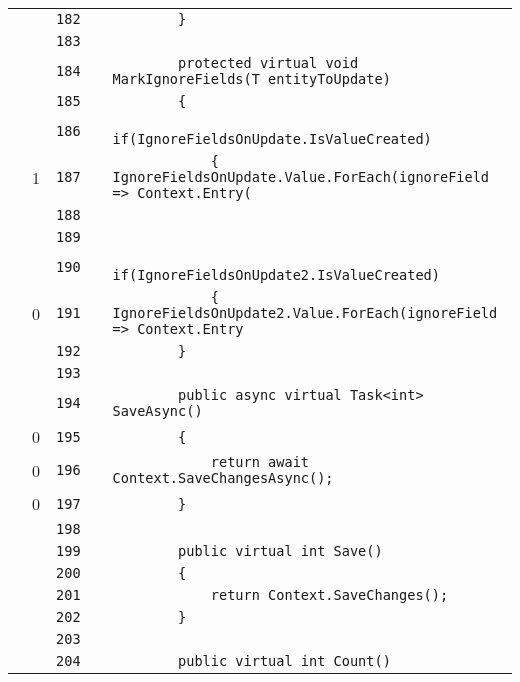 \documentclass[a4paper,10pt]{article}
\begin{document}
\begin{longtable}[l]{lrrll}
\cellcolor{gray} &  & \verb~182~ & & \verb~        }~\\
\cellcolor{gray} &  & \verb~183~ & & \verb~~\\
\cellcolor{gray} &  & \verb~184~ & & \verb~        protected virtual void MarkIgnoreFields(T entityToUpdate)~\\
\cellcolor{gray} &  & \verb~185~ & & \verb~        {~\\
\cellcolor{gray} &  & \verb~186~ & & \verb~            if(IgnoreFieldsOnUpdate.IsValueCreated)~\\
\cellcolor{green} & 1 & \verb~187~ & & \verb~            { IgnoreFieldsOnUpdate.Value.ForEach(ignoreField => Context.Entry(~\\
\cellcolor{gray} &  & \verb~188~ & & \verb~~\\
\cellcolor{gray} &  & \verb~189~ & & \verb~~\\
\cellcolor{gray} &  & \verb~190~ & & \verb~            if(IgnoreFieldsOnUpdate2.IsValueCreated)~\\
\cellcolor{red} & 0 & \verb~191~ & & \verb~            { IgnoreFieldsOnUpdate2.Value.ForEach(ignoreField => Context.Entry~\\
\cellcolor{gray} &  & \verb~192~ & & \verb~        }~\\
\cellcolor{gray} &  & \verb~193~ & & \verb~~\\
\cellcolor{gray} &  & \verb~194~ & & \verb~        public async virtual Task<int> SaveAsync()~\\
\cellcolor{red} & 0 & \verb~195~ & & \verb~        {~\\
\cellcolor{red} & 0 & \verb~196~ & & \verb~            return await Context.SaveChangesAsync();~\\
\cellcolor{red} & 0 & \verb~197~ & & \verb~        }~\\
\cellcolor{gray} &  & \verb~198~ & & \verb~~\\
\cellcolor{gray} &  & \verb~199~ & & \verb~        public virtual int Save()~\\
\cellcolor{gray} &  & \verb~200~ & & \verb~        {~\\
\cellcolor{gray} &  & \verb~201~ & & \verb~            return Context.SaveChanges();~\\
\cellcolor{gray} &  & \verb~202~ & & \verb~        }~\\
\cellcolor{gray} &  & \verb~203~ & & \verb~~\\
\cellcolor{gray} &  & \verb~204~ & & \verb~        public virtual int Count()~\\

\end{longtable}
\end{document}
